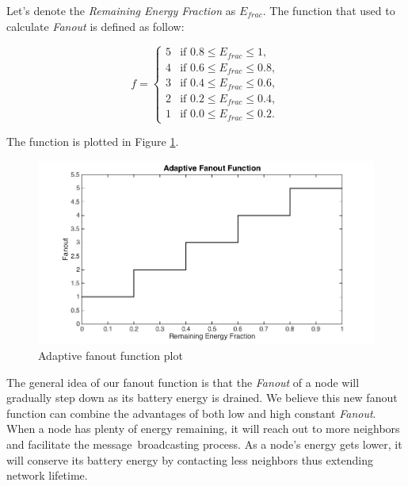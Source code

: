 \documentclass[onehalf,11pt]{beavtex}
\newcommand{\msg}{message}
\begin{document}
Let's denote the \emph{Remaining Energy Fraction} as $E_{frac}$. The function that used to calculate \emph{Fanout} is defined as follow:

\begin{equation*}
f = \left\{
\begin{array}{rl}
5 & \text{if } 0.8 \leq E_{frac} \leq 1,\\
4 & \text{if } 0.6 \leq E_{frac} \leq 0.8,\\
3 & \text{if } 0.4 \leq E_{frac} \leq 0.6,\\
2 & \text{if } 0.2 \leq E_{frac} \leq 0.4,\\					
1 & \text{if } 0.0 \leq E_{frac} \leq 0.2.
\end{array} \right.
\end{equation*}

The function is plotted in Figure \ref{fig:step}.

\begin{figure}[h]
	\centering
	\includegraphics[width=5.5in]{stepFunction2.png}
	\caption{Adaptive fanout function plot}
	\label{fig:step}
\end{figure}

The general idea of our fanout function is that the \emph{Fanout} of a node will gradually step down as its battery energy is drained. We believe this new fanout function can combine the advantages of both low and high constant \emph{Fanout}. When a node has plenty of energy remaining, it will reach out to more neighbors and facilitate the \msg ~broadcasting process. As a node's energy gets lower, it will conserve its battery energy by contacting less neighbors thus extending network lifetime.
\end{document}
